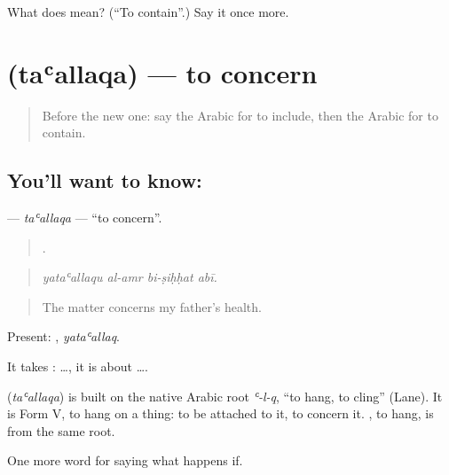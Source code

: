 \begin{tcolorbox}[breakable,colback=teal!4,colframe=teal!35!black,title={Before you move on}]
What does  mean? (\textquotedblleft{}To contain\textquotedblright{}.) Say it once more.
\end{tcolorbox}
\section[\texorpdfstring{\ar{تعلق} (taʿallaqa)}{تعلق (taʿallaqa)}]{ (taʿallaqa) — to concern}

\label{lesson:AR-C405-taallaqa}



\begin{quote}
Before the new one: say the Arabic for to include, then the Arabic for to contain.
\end{quote}

\subsection*{You'll want to know: }
\textbf{} — \emph{taʿallaqa} — \textquotedblleft{}to concern\textquotedblright{}.

\begin{quote}
   .
\end{quote}

\begin{quote}
\emph{yataʿallaqu al-amr bi-ṣiḥḥat abī.}
\end{quote}

\begin{quote}
The matter concerns my father's health.
\end{quote}

Present: , \emph{yataʿallaq}.

It takes :   …, it is about ….

\begin{cousinweb}
\textbf{} (\emph{taʿallaqa}) is built on the native Arabic root \emph{ʿ-l-q}, \textquotedblleft{}to hang, to cling\textquotedblright{} (Lane). It is Form V, to hang on a thing: to be attached to it, to concern it. , to hang, is from the same root.
\end{cousinweb}

\begin{grammarlens}[title={What you've built}]
One more word for saying what happens if.
\end{grammarlens}

